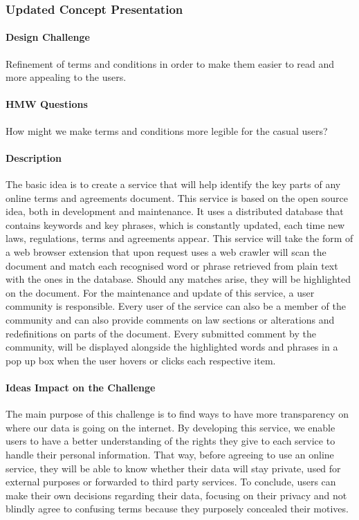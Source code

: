 \subsubsection{Updated Concept Presentation}

\paragraph{Design Challenge} 

Refinement of terms and conditions in order to make them easier to read and more 
appealing to the users.

\paragraph{HMW Questions}

How might we make terms and conditions more legible for the casual users?

\paragraph{Description}

The basic idea is to create a service that will help identify the key parts of 
any online terms and agreements document. This service is based on the open 
source idea, both in development and maintenance. It uses a distributed database 
that contains keywords and key phrases, which is constantly updated, each time 
new laws, regulations, terms and agreements appear. This service will take the 
form of a web browser extension that upon request uses a web crawler will scan 
the document and match each recognised word or phrase retrieved from plain text 
with the ones in the database. Should any matches arise, they will be 
highlighted on the document. For the maintenance and update of this service, a 
user community is responsible. Every user of the service can also be a member of 
the community and can also provide comments on law sections or alterations and 
redefinitions on parts of the document. Every submitted comment by the community, 
will be displayed alongside the highlighted words and phrases in a pop up box 
when the user hovers or clicks each respective item.

\paragraph{Ideas Impact on the Challenge}

The main purpose of this challenge is to find ways to have more transparency on 
where our data is going on the internet. By developing this service, we enable 
users to have a better understanding of the rights they give to each service to 
handle their personal information. That way, before agreeing to use an online 
service, they will be able to know whether their data will stay private, used 
for external purposes or forwarded to third party services. To conclude, users 
can make their own decisions regarding their data, focusing on their privacy and 
not blindly agree to confusing terms because they purposely concealed their 
motives.

